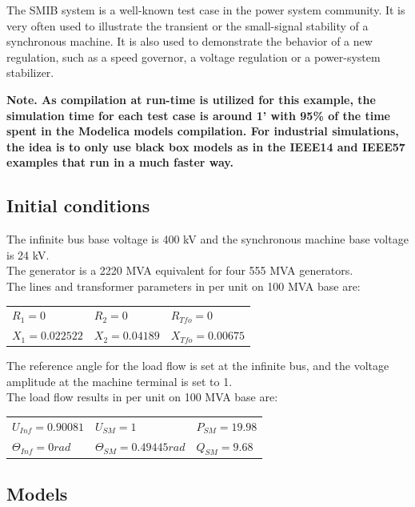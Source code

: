 \documentclass[a4paper, 12pt]{report}
\begin{document}
The SMIB system is a well-known test case in the power system community. It is very often used to illustrate the transient or the small-signal stability of a synchronous machine. It is also used to demonstrate the behavior of a new regulation, such as a speed governor, a voltage regulation or a power-system stabilizer.

\textbf{Note. As compilation at run-time is utilized for this example, the simulation time for each test case is around 1' with 95\% of the time spent in the Modelica models compilation. For industrial simulations, the idea is to only use black box models as in the IEEE14 and IEEE57 examples that run in a much faster way.}

\subsection{Initial conditions}

The infinite bus base voltage is 400 kV and the synchronous machine base voltage is 24 kV. \\

The generator is a 2220 MVA equivalent for four 555 MVA generators.\\

The lines and transformer parameters in per unit on 100 MVA base are:
\begin{center}
\begin{tabular}{l|l|l}
   $R_1=0$ & $R_2=0$ & $R_{Tfo}=0$ \\
   $X_1=0.022522$ & $X_2=0.04189$ & $X_{Tfo}=0.00675$ \\
\end{tabular}
\end{center}

The reference angle for the load flow is set at the infinite bus, and the voltage amplitude at the machine terminal is set to 1. \\

The load flow results in per unit on 100 MVA base are:
\begin{center}
\begin{tabular}{l|l|l}
   $U_{Inf}=0.90081$ & $U_{SM}=1$ & $P_{SM}=19.98$ \\
   $\Theta_{Inf}=0rad$ & $\Theta_{SM}=0.49445rad$ & $Q_{SM}=9.68$ \\
\end{tabular}
\end{center}

\subsection{Models}
\end{document}
